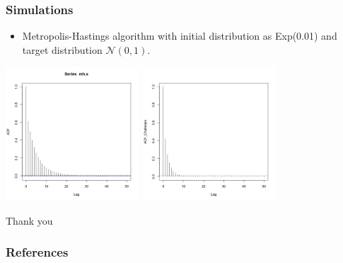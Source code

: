\documentclass [xcolor=svgnames, t] {beamer}
\begin{document}
\begin{frame}
    \frametitle{Simulations}
    \begin{itemize}
        \item Metropolis-Hastings algorithm with initial distribution as Exp(0.01) and target distribution $\mathcal{N}(0, 1)$.
    \end{itemize}
    \vspace{2em}
    \centering
        \includegraphics[width=5cm]{acf_mh.jpg}
        \includegraphics[width=5cm]{acf_mh_chatterjee.jpg}
\end{frame}

\begin{frame}
    \vspace{10em}
    \centering
    \begin{LARGE}
    Thank you
    \end{LARGE}

\end{frame}

\begin{frame} [allowframebreaks]\frametitle{References}
        
        
\end{frame}
\end{document}
